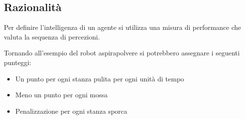 \documentclass[a4paper]{article}
\begin{document}
\subsection{Razionalità}
Per definire l'intelligenza di un agente si utilizza una misura di performance che
valuta la sequenza di percezioni.
\begin{example}
  Tornando all'esempio del robot aspirapolvere si potrebbero assegnare i seguenti
  punteggi:
  \begin{itemize}
    \item Un punto per ogni stanza pulita per ogni unità di tempo
    \item Meno un punto per ogni mossa
    \item Penalizzazione per ogni stanza sporca
  \end{itemize}
\end{example}
\end{document}
